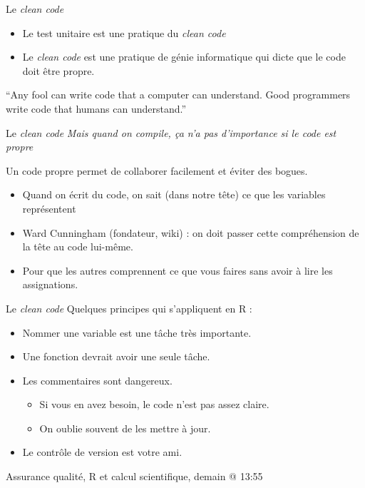\documentclass[11pt]{beamer}
\begin{document}
\begin{frame}{Le \textit{clean code}} %
\begin{itemize}%
\item Le test unitaire est une pratique du \textit{clean code}
\item Le \textit{clean code} est une pratique de génie informatique qui dicte que le code doit être propre. %
\end{itemize}
\begin{block}{} %
{\large ``Any fool can write code that a computer can understand. Good programmers
write code that humans can understand.''}
\vskip5mm
\hspace*{}
\end{block}
\end{frame}

\begin{frame}{Le \textit{clean code}}
\textit{Mais quand on compile, ça n'a pas d'importance si le code est propre}

Un code propre permet de collaborer facilement et éviter des bogues. 
\begin{itemize}
\item Quand on écrit du code, on sait (dans notre tête) ce que les variables représentent
\item Ward Cunningham (fondateur, wiki) : on doit passer cette compréhension de la tête au code lui-même. %
\item Pour que les autres comprennent ce que vous faires sans avoir à lire les assignations. 
\end{itemize}
\end{frame}

\begin{frame}{Le \textit{clean code}}
Quelques principes qui s'appliquent en \textsf{R} : 
\begin{itemize}
\item Nommer une variable est une tâche très importante. 
\item Une fonction devrait avoir une seule tâche. 
\item Les commentaires sont dangereux. 
\begin{itemize}
\item Si vous en avez besoin, le code n'est pas assez claire. %
\item On oublie souvent de les mettre à jour. 
\end{itemize}
\item Le contrôle de version est votre ami. 
\end{itemize}
Assurance qualité, R et calcul scientifique, demain @ 13:55 
\end{frame}
\end{document}
